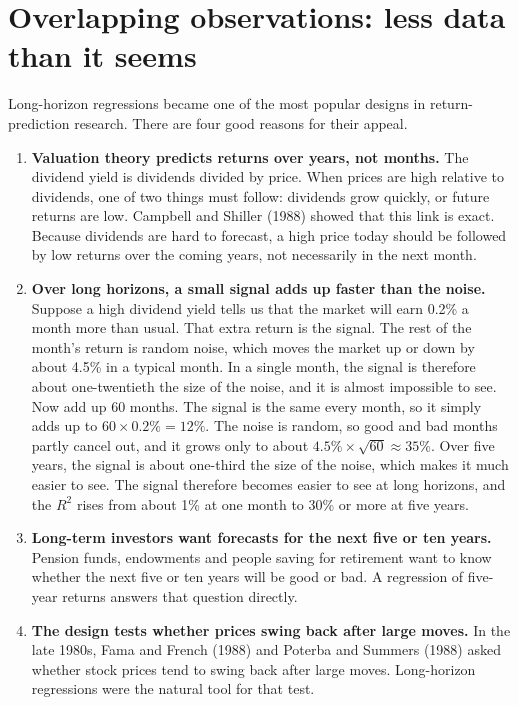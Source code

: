 \section{Overlapping observations: less data than it seems}
\label{sec:03-overlap}

Long-horizon regressions became one of the most popular designs in return-prediction research. There are four good reasons for their appeal.

\begin{enumerate}
  \item \textbf{Valuation theory predicts returns over years, not months.} The dividend yield is dividends divided by price. When prices are high relative to dividends, one of two things must follow: dividends grow quickly, or future returns are low. Campbell and Shiller (1988) showed that this link is exact. Because dividends are hard to forecast, a high price today should be followed by low returns over the coming years, not necessarily in the next month.
  \item \textbf{Over long horizons, a small signal adds up faster than the noise.} Suppose a high dividend yield tells us that the market will earn 0.2\% a month more than usual. That extra return is the signal. The rest of the month's return is random noise, which moves the market up or down by about 4.5\% in a typical month. In a single month, the signal is therefore about one-twentieth the size of the noise, and it is almost impossible to see. Now add up 60 months. The signal is the same every month, so it simply adds up to $60 \times 0.2\% = 12\%$. The noise is random, so good and bad months partly cancel out, and it grows only to about $4.5\% \times \sqrt{60} \approx 35\%$. Over five years, the signal is about one-third the size of the noise, which makes it much easier to see. The signal therefore becomes easier to see at long horizons, and the $R^2$ rises from about 1\% at one month to 30\% or more at five years.
  \item \textbf{Long-term investors want forecasts for the next five or ten years.} Pension funds, endowments and people saving for retirement want to know whether the next five or ten years will be good or bad. A regression of five-year returns answers that question directly.
  \item \textbf{The design tests whether prices swing back after large moves.} In the late 1980s, Fama and French (1988) and Poterba and Summers (1988) asked whether stock prices tend to swing back after large moves. Long-horizon regressions were the natural tool for that test.
\end{enumerate}

